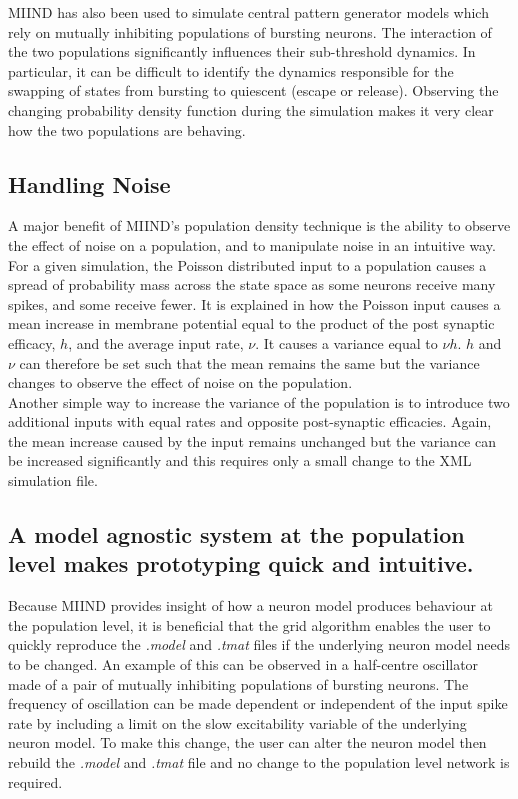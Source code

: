 \documentclass[utf8]{frontiersSCNS} %
\begin{document}
MIIND has also been used to simulate central pattern generator models which rely on mutually inhibiting populations of bursting neurons. The interaction of the two populations significantly influences their sub-threshold dynamics. In particular, it can be difficult to identify the dynamics responsible for the swapping of states from bursting to quiescent (escape or release). Observing the changing probability density function during the simulation makes it very clear how the two populations are behaving.\\

\subsection*{Handling Noise}
\label{handlingnoise}
A major benefit of MIIND's population density technique is the ability to observe the effect of noise on a population, and to manipulate noise in an intuitive way. For a given simulation, the Poisson distributed input to a population causes a spread of probability mass across the state space as some neurons receive many spikes, and some receive fewer. It is explained in \cite{de2013generic} how the Poisson input causes a mean increase in membrane potential equal to the product of the post synaptic efficacy, $h$, and the average input rate, $\nu$. It causes a variance equal to $\nu h$\texttwosuperior. $h$ and $\nu$ can therefore be set such that the mean remains the same but the variance changes to observe the effect of noise on the population.\\

Another simple way to increase the variance of the population is to introduce two additional inputs with equal rates and opposite post-synaptic efficacies. Again, the mean increase caused by the input remains unchanged but the variance can be increased significantly and this requires only a small change to the XML simulation file.\\

\subsection*{A model agnostic system at the population level makes prototyping quick and intuitive.}
Because MIIND provides insight of how a neuron model produces behaviour at the population level, it is beneficial that the grid algorithm enables the user to quickly reproduce the \textit{.model} and \textit{.tmat} files if the underlying neuron model needs to be changed. An example of this can be observed in a half-centre oscillator made of a pair of mutually inhibiting populations of bursting neurons. The frequency of oscillation can be made dependent or independent of the input spike rate by including a limit on the slow excitability variable of the underlying neuron model. To make this change, the user can alter the neuron model then rebuild the \textit{.model} and \textit{.tmat} file and no change to the population level network is required.\\
\end{document}
